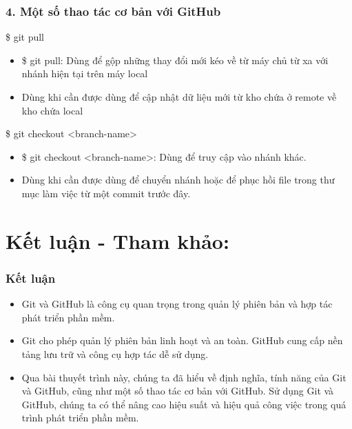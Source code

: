 \documentclass{beamer}
\begin{document}

\begin{frame}
\frametitle{ 4. Một số thao tác cơ bản với GitHub}
\begin{block}{ \$ git pull}
\begin{itemize}
\item \$ git pull: Dùng để gộp những thay đổi mới kéo về từ máy chủ từ xa với nhánh hiện tại trên máy local
\item Dùng khi cần được dùng để cập nhật dữ liệu mới từ kho chứa ở remote về kho chứa local
\end{itemize}

\end{block}
\begin{block}{ \$ git checkout <branch-name>}
\begin{itemize}
\item \$ git checkout <branch-name>: Dùng để truy cập vào nhánh khác.
\item Dùng khi cần được dùng để chuyển nhánh hoặc để phục hồi file trong thư mục làm việc từ một commit trước đây.
\end{itemize}

\end{block}
\end{frame}

\section{Kết luận - Tham khảo:} 
\begin{frame}
\frametitle{Kết luận}
\begin{itemize}
\item Git và GitHub là công cụ quan trọng trong quản lý phiên bản và hợp tác phát triển phần mềm.  
\item Git cho phép quản lý phiên bản linh hoạt và an toàn. GitHub cung cấp nền tảng lưu trữ và công cụ hợp tác dễ sử dụng.
\item Qua bài thuyết trình này, chúng ta đã hiểu về định nghĩa, tính năng của Git và GitHub, cũng như một số thao tác cơ bản với GitHub. Sử dụng Git và GitHub, chúng ta có thể nâng cao hiệu suất và hiệu quả công việc trong quá trình phát triển phần mềm.


\end{itemize}
\end{frame}
\end{document}
